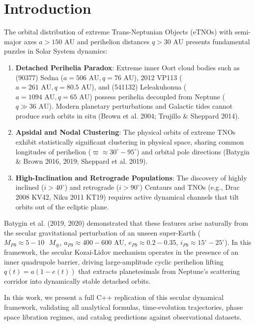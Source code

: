 \documentclass[11pt,a4paper]{article}
\begin{document}
\section{Introduction}
The orbital distribution of extreme Trans-Neptunian Objects (eTNOs) with semi-major axes $a > 150\text{ AU}$ and perihelion distances $q > 30\text{ AU}$ presents fundamental puzzles in Solar System dynamics:
\begin{enumerate}
    \item \textbf{Detached Perihelia Paradox}: Extreme inner Oort cloud bodies such as (90377) Sedna ($a = 506\text{ AU}, q = 76\text{ AU}$), 2012 VP113 ($a = 261\text{ AU}, q = 80.5\text{ AU}$), and (541132) Leleakuhonua ($a = 1094\text{ AU}, q = 65\text{ AU}$) possess perihelia decoupled from Neptune ($q \gg 36\text{ AU}$). Modern planetary perturbations and Galactic tides cannot produce such orbits in situ (Brown et al. 2004; Trujillo \& Sheppard 2014).
    \item \textbf{Apsidal and Nodal Clustering}: The physical orbits of extreme TNOs exhibit statistically significant clustering in physical space, sharing common longitudes of perihelion ($\varpi \approx 30^\circ - 95^\circ$) and orbital pole directions (Batygin \& Brown 2016, 2019; Sheppard et al. 2019).
    \item \textbf{High-Inclination and Retrograde Populations}: The discovery of highly inclined ($i > 40^\circ$) and retrograde ($i > 90^\circ$) Centaurs and TNOs (e.g., Drac 2008 KV42, Niku 2011 KT19) requires active dynamical channels that tilt orbits out of the ecliptic plane.
\end{enumerate}

Batygin et al. (2019, 2020) demonstrated that these features arise naturally from the secular gravitational perturbation of an unseen super-Earth ($M_{P9} \approx 5 - 10\text{ }M_\oplus$, $a_{P9} \approx 400 - 600\text{ AU}$, $e_{P9} \approx 0.2 - 0.35$, $i_{P9} \approx 15^\circ - 25^\circ$). In this framework, the secular Kozai-Lidov mechanism operates in the presence of an inner quadrupole barrier, driving large-amplitude cyclic perihelion lifting $q(t) = a(1 - e(t))$ that extracts planetesimals from Neptune's scattering corridor into dynamically stable detached orbits.

In this work, we present a full C++ replication of this secular dynamical framework, validating all analytical formulas, time-evolution trajectories, phase space libration regimes, and catalog predictions against observational datasets.
\end{document}
